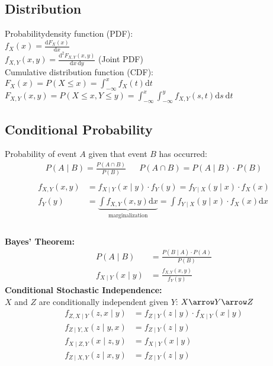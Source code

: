 \begin{mdframed}[style=eqbox]
  \subsection{Distribution}
  Probabilitydensity function (PDF): \\
  $f_X(x) = \frac{\text{d} F_X(x)}{\text{d} x}$\\
  $f_{X,Y}(x,y) = \frac{\text{d}^2 F_{X,Y}(x,y)}{\text{d}x~\text{d}y}$ (Joint PDF)\\[0.5em]
  Cumulative distribution function (CDF): \\
  $F_X(x) = P({X \leq x}) = \int_{-\infty}^{x} f_X(t) \text{d} t$\\
  $F_{X,Y}(x,y) = P({X \leq x, Y \leq y}) = \int_{-\infty}^{x} \int_{-\infty}^{y} f_{X,Y}(s,t) \text{d}s~\text{d}t$
\end{mdframed}

\begin{mdframed}[style=eqbox]
  \subsection{Conditional Probability}
  Probability of event $A$ given that event $B$ has occurred:
  \begin{align*}
    P(A \mid B) = \frac{P(A \cap B)}{P(B)} && P(A \cap B) = P(A \mid B) \cdot P(B)\\
  \end{align*}
  \vspace*{-32pt}
  \begin{align*}
    f_{X,Y}(x,y) &= f_{X \mid Y}(x \mid y) \cdot f_Y(y) = f_{Y \mid X}(y \mid x) \cdot f_X(x)\\
    f_{Y}(y) &= \underbrace{\int f_{X,Y}(x,y) \text{d}x}_{\text{marginalization}} = \int f_{Y \mid X}(y \mid x) \cdot f_X(x) \text{d}x\\
  \end{align*}\vspace*{-24pt}\\
  \textbf{Bayes' Theorem:}
  \vspace*{-4pt}
  \begin{align*}
    P(A \mid B) &= \frac{P(B \mid A) \cdot P(A)}{P(B)}\\
    f_{X \mid Y}(x \mid y) &= \frac{f_{X,Y}(x,y)}{f_Y(y)}
  \end{align*}
  \textbf{Conditional Stochastic Independence:}\\
  $X$ and $Z$ are conditionally independent given $Y$: $X \arrow Y \arrow Z$
  \vspace*{-4pt}
  \begin{align*}
    f_{Z,X \mid Y}(z,x \mid y) &= f_{Z \mid Y}(z \mid y) \cdot f_{X \mid Y}(x \mid y)\\
    f_{Z \mid Y, X}(z \mid y, x) &= f_{Z \mid Y}(z \mid y)\\
    f_{X \mid Z,Y}(x \mid z, y) &= f_{X \mid Y}(x \mid y)\\
    f_{Z \mid X,Y}(z \mid x, y) &= f_{Z \mid Y}(z \mid y)
  \end{align*}
\end{mdframed}

